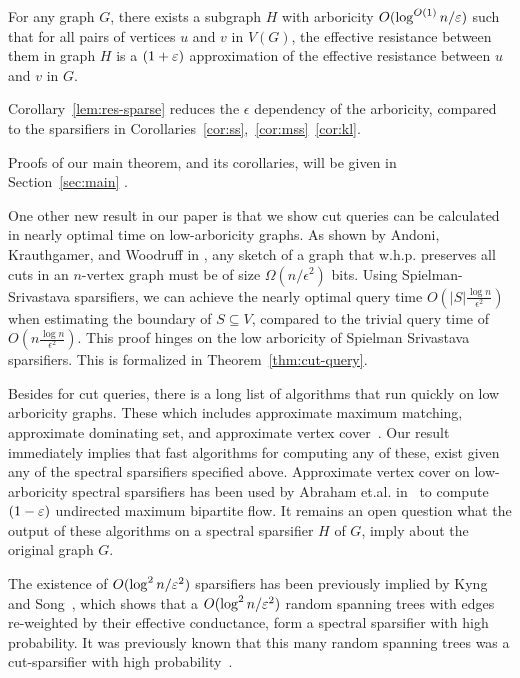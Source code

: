 \begin{corollary}\label{lem:res-sparse}
  For any graph $G$, there exists a subgraph $H$ with arboricity $O(\log^{O(1)} n / \varepsilon)$
  such that for all pairs of vertices $u$ and $v$ in $V(G)$, the effective resistance
  between them in graph $H$ is a $(1+\varepsilon)$ approximation of the
  effective resistance between $u$ and $v$ in $G$.
\end{corollary}
Corollary~\ref{lem:res-sparse} reduces the $\epsilon$ dependency of the
arboricity, compared to the sparsifiers in
Corollaries~\ref{cor:ss},~\ref{cor:mss}~\ref{cor:kl}.

Proofs of our main theorem, and its corollaries, will be given in
Section~\ref{sec:main} .

One other new result in our paper is that we show cut queries can be
calculated in nearly optimal time on low-arboricity graphs.
As shown by Andoni, Krauthgamer, and Woodruff in \cite{AndoniKW14},
any sketch of a graph that w.h.p.
preserves all cuts in an $n$-vertex graph must be of size
$\Omega(n/\epsilon^2)$ bits.
Using Spielman-Srivastava sparsifiers, we can achieve the
nearly optimal query time $O\left(|S|\frac{\log n}{\epsilon^2}\right)$
when estimating the boundary of $S \subseteq V$, compared to the trivial
query time of $O\left(n\frac{\log n}{\epsilon^2}\right)$. This proof
hinges on the low arboricity of Spielman Srivastava sparsifiers.
This is formalized in Theorem~\ref{thm:cut-query}.

Besides for cut queries, there is a long list of algorithms that run quickly on low arboricity
graphs. These 
which includes approximate maximum matching, approximate
dominating set, and approximate vertex cover~\cite{Solomon18,
Suomeloa12, KuhnW05, LinSS12, GoelG06}. Our result immediately implies
that fast algorithms for computing any of these, exist given any of the
spectral sparsifiers specified above. Approximate vertex cover on low-arboricity spectral
sparsifiers has been used by Abraham et.al. in~\cite{AbrahamDKKP16} to
compute $(1-\varepsilon)$ undirected maximum bipartite flow.
It remains an open question what the output of these algorithms on a
spectral sparsifier $H$ of $G$, imply
about the original graph $G$.  

The existence of $O(\log^2 n / \varepsilon^2)$ sparsifiers has been previously
implied by Kyng and Song~\cite{KyngS18}, which shows that a $O(\log^2
n / \varepsilon^2)$ random spanning trees with edges re-weighted by their
effective conductance, form a spectral sparsifier with high
probability. It was previously known that this many random spanning
trees was a cut-sparsifier with high probability~\cite{FungH10}. 
